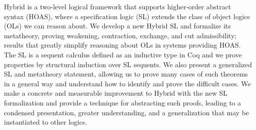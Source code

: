 \documentclass[12pt]{UOthesis}
\theoremstyle{remarkstyle}
\begin{document}

%
%

Hybrid is a two-level logical framework that supports higher-order abstract syntax (HOAS), where a specification logic (SL) extends the class of object logics (OLs) we can reason about. We develop a new Hybrid SL and formalize its metatheory, proving weakening, contraction, exchange, and cut admissibility; results that greatly simplify reasoning about OLs in systems providing HOAS. The SL is a sequent calculus defined as an inductive type in Coq and we prove properties by structural induction over SL sequents. We also present a generalized SL and metatheory statement, allowing us to prove many cases of such theorems in a general way and understand how to identify and prove the difficult cases. We make a concrete and measurable improvement to Hybrid with the new SL formalization and provide a technique for abstracting such proofs, leading to a condensed presentation, greater understanding, and a generalization that may be instantiated to other logics.
\end{document}
